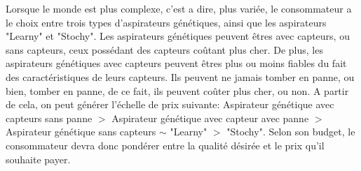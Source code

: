 \documentclass[12pt]{article}
\begin{document}
\justify
Lorsque le monde est plus complexe, c'est a dire, plus variée, le consommateur a le choix entre trois types d'aspirateurs génétiques, ainsi que les aspirateurs "Learny" et "Stochy". Les aspirateurs génétiques peuvent êtres avec capteurs, ou sans capteurs, ceux possédant des capteurs coûtant plus cher. De plus, les aspirateurs génétiques avec capteurs peuvent êtres plus ou moins fiables du fait des caractéristiques de leurs capteurs. Ils peuvent ne jamais tomber en panne, ou bien, tomber en panne, de ce fait, ils peuvent coûter plus cher, ou non. A partir de cela, on peut générer l'échelle de prix suivante: Aspirateur génétique avec capteurs sans panne $>$ Aspirateur génétique avec capteur avec panne $>$ Aspirateur génétique sans capteurs $\sim$ "Learny" $>$ "Stochy". Selon son budget, le consommateur devra donc pondérer entre la qualité désirée et le prix qu'il souhaite payer. 
\end{document}
